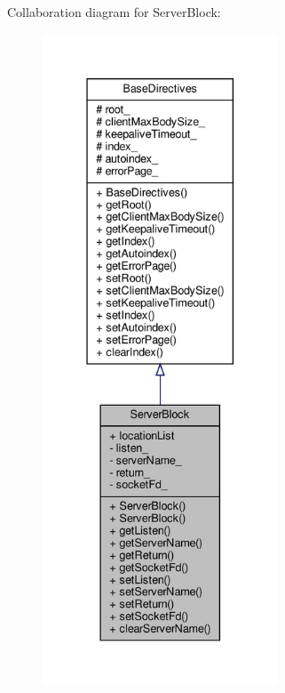 Collaboration diagram for Server\+Block\+:
\nopagebreak
\begin{figure}[H]
\begin{center}
\leavevmode
\includegraphics[height=550pt]{classft_1_1_server_block__coll__graph}
\end{center}
\end{figure}
